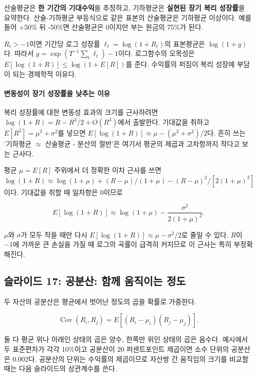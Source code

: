 \documentclass[11pt,a4paper]{article}
\begin{document}
산술평균은 \textbf{한 기간의 기대수익}을 추정하고, 기하평균은 \textbf{실현된 장기 복리 성장률}을 요약한다. 산술-기하평균 부등식으로 같은 표본의 산술평균은 기하평균 이상이다. 예를 들어 +50\% 뒤 -50\%면 산술평균은 0이지만 부는 원금의 75\%가 된다.
\par

$R_t>-1$이면 기간당 로그 성장률 $\ell_t=\log(1+R_t)$의 표본평균은 $\log(1+g)$다. 따라서 $g=\exp(T^{-1}\sum_t\ell_t)-1$이다. 로그함수의 오목성은 $E[\log(1+R)]\le\log(1+E[R])$를 준다. 수익률의 퍼짐이 복리 성장에 부담이 되는 경제학적 이유다.
\par

\paragraph{변동성이 장기 성장률을 낮추는 이유}

복리 성장률에 대한 변동성 효과의 크기를 근사하려면 $\log(1+R)=R-R^2/2+O(R^3)$에서 출발한다. 기대값을 취하고 $E[R^2]=\mu^2+\sigma^2$를 넣으면 $E[\log(1+R)]\approx\mu-(\mu^2+\sigma^2)/2$다. 흔히 쓰는 '기하평균 \ensuremath{\approx} 산술평균 - 분산의 절반'은 여기서 평균의 제곱과 고차항까지 작다고 보는 근사다.
\par

평균 $\mu=E[R]$ 주위에서 더 정확한 이차 근사를 쓰면 $\log(1+R)\approx\log(1+\mu)+(R-\mu)/(1+\mu)-(R-\mu)^2/[2(1+\mu)^2]$이다. 기대값을 취할 때 일차항은 0이므로
\par

\[
E[\log(1+R)]\approx\log(1+\mu)
-\frac{\sigma^2}{2(1+\mu)^2}.
\]

$\mu$와 $\sigma$가 모두 작을 때만 다시 $E[\log(1+R)]\approx\mu-\sigma^2/2$로 줄일 수 있다. $R$이 $-1$에 가까운 큰 손실을 가질 때 로그의 곡률이 급격히 커지므로 이 근사는 특히 부정확해진다.
\par

\subsection{슬라이드 17: 공분산: 함께 움직이는 정도}

두 자산의 공분산은 평균에서 벗어난 정도의 곱을 확률로 가중한다.
\par

\[
\operatorname{Cov}(R_i,R_j)=E[(R_i-\mu_i)(R_j-\mu_j)].
\]

둘 다 평균 위나 아래인 상태의 곱은 양수, 한쪽만 위인 상태의 곱은 음수다. 예시에서 두 표준편차가 각각 10\%이고 공분산이 $20$ 퍼센트포인트 제곱이면 소수 단위의 공분산은 $0.002$다. 공분산의 단위는 수익률의 제곱이므로 자산쌍 간 움직임의 크기를 비교할 때는 다음 슬라이드의 상관계수를 쓴다.
\par
\end{document}
